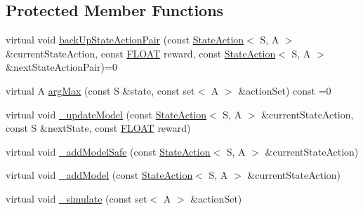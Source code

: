 \subsection*{Protected Member Functions}
\begin{DoxyCompactItemize}
\item 
virtual void \hyperlink{classAI_1_1Algorithm_1_1DynaQBase_a0d5777706e9c2be04ee1834ad593c795}{back\+Up\+State\+Action\+Pair} (const \hyperlink{classAI_1_1StateAction}{State\+Action}$<$ S, A $>$ \&current\+State\+Action, const \hyperlink{namespaceAI_a41b74884a20833db653dded3918e05c3}{F\+L\+O\+A\+T} reward, const \hyperlink{classAI_1_1StateAction}{State\+Action}$<$ S, A $>$ \&next\+State\+Action\+Pair)=0
\item 
virtual A \hyperlink{classAI_1_1Algorithm_1_1DynaQBase_a32044f721ba4afbca5ea144b3f84135b}{arg\+Max} (const S \&state, const set$<$ A $>$ \&action\+Set) const =0
\item 
virtual void \hyperlink{classAI_1_1Algorithm_1_1DynaQBase_a4a45b9303a4b9e0cf93b9a5272739b35}{\+\_\+update\+Model} (const \hyperlink{classAI_1_1StateAction}{State\+Action}$<$ S, A $>$ \&current\+State\+Action, const S \&next\+State, const \hyperlink{namespaceAI_a41b74884a20833db653dded3918e05c3}{F\+L\+O\+A\+T} reward)
\item 
virtual void \hyperlink{classAI_1_1Algorithm_1_1DynaQBase_a0524b63604a75fd079b85a3a6e6ac93d}{\+\_\+add\+Model\+Safe} (const \hyperlink{classAI_1_1StateAction}{State\+Action}$<$ S, A $>$ \&current\+State\+Action)
\item 
virtual void \hyperlink{classAI_1_1Algorithm_1_1DynaQBase_aefe879b3103a6c4f46176d9fcb1a911d}{\+\_\+add\+Model} (const \hyperlink{classAI_1_1StateAction}{State\+Action}$<$ S, A $>$ \&current\+State\+Action)
\item 
virtual void \hyperlink{classAI_1_1Algorithm_1_1DynaQBase_ae33343ea87f96ee3a2c2651bfd2cbcc5}{\+\_\+simulate} (const set$<$ A $>$ \&action\+Set)
\end{DoxyCompactItemize}
